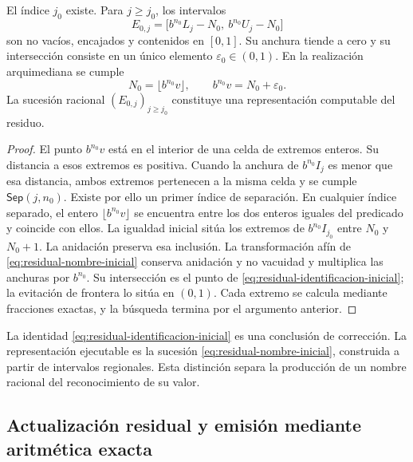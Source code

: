 \begin{theorem}
\label{thm:residual-inicializacion}
El índice \(j_0\) existe. Para \(j\geq j_0\), los intervalos
\begin{equation}
 E_{0,j}=
 \bigl[b^{n_0}L_j-N_0,\ b^{n_0}U_j-N_0\bigr]
 \label{eq:residual-nombre-inicial}
\end{equation}
son no vacíos, encajados y contenidos en \([0,1]\). Su anchura tiende a
cero y su intersección consiste en un único elemento
\(\varepsilon_0\in(0,1)\). En la realización arquimediana se cumple
\begin{equation}
 N_0=\lfloor b^{n_0}v\rfloor,
 \qquad b^{n_0}v=N_0+\varepsilon_0.
 \label{eq:residual-identificacion-inicial}
\end{equation}
La sucesión racional \((E_{0,j})_{j\geq j_0}\) constituye una
representación computable del residuo.
\end{theorem}
\begin{proof}
El punto \(b^{n_0}v\) está en el interior de una celda de extremos
enteros. Su distancia a esos extremos es positiva. Cuando la anchura de
\(b^{n_0}I_j\) es menor que esa distancia, ambos extremos pertenecen a la
misma celda y se cumple \(\mathsf{Sep}(j,n_0)\). Existe por ello un
primer índice de separación. En cualquier índice separado, el entero
\(\lfloor b^{n_0}v\rfloor\) se encuentra entre los dos enteros iguales
del predicado y coincide con ellos. La igualdad inicial sitúa los extremos
de \(b^{n_0}I_{j_0}\) entre \(N_0\) y \(N_0+1\). La anidación
preserva esa inclusión. La transformación afín de
\eqref{eq:residual-nombre-inicial} conserva anidación y no vacuidad y
multiplica las anchuras por \(b^{n_0}\). Su intersección es el punto de
\eqref{eq:residual-identificacion-inicial}; la evitación de frontera lo
sitúa en \((0,1)\). Cada extremo se calcula mediante fracciones exactas,
y la búsqueda termina por el argumento anterior.
\end{proof}

La identidad \eqref{eq:residual-identificacion-inicial} es una conclusión
de corrección. La representación ejecutable es la sucesión
\eqref{eq:residual-nombre-inicial}, construida a partir de intervalos
regionales. Esta distinción separa la producción de un nombre racional del
reconocimiento de su valor.

\subsection{Actualización residual y emisión mediante aritmética exacta}
\label{subsec:residual-actualizacion}

